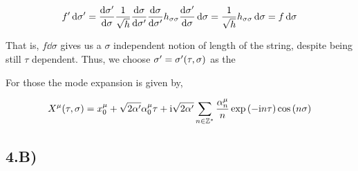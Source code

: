 \begin{align*}
    f'\dd{\sigma'}=\dv{\sigma'}{\sigma}\frac{1}{\sqrt h}\dv{\sigma}{\sigma'}\dv{\sigma}{\sigma'}h_{\sigma\sigma}\dv{\sigma'}{\sigma}\dd{\sigma}=\frac{1}{\sqrt h}h_{\sigma\sigma}\dd{\sigma}=f\dd{\sigma}
\end{align*}

That is, $f\dd{\sigma}$ gives us a $\sigma$ independent notion of length of the string, despite being still $\tau$ dependent. 
Thus, we choose $\sigma'=\sigma'\qty(\tau,\sigma)$ as the 

For those the mode expansion is given by,

\begin{align*}
    X^\mu\qty(\tau,\sigma)=x_0^\mu+\sqrt{2\alpha'}\alpha_0^\mu\tau+\textnormal{i}\sqrt{2\alpha'}\sum\limits_{n\in\mathbb Z^\ast}\frac{\alpha_n^\mu}{n}\exp\qty(-\textnormal{i} n\tau)\cos\qty(n\sigma)
\end{align*}

\subsection{4.B)}